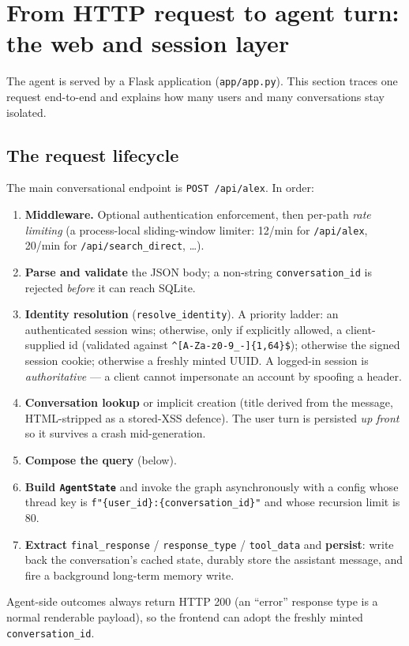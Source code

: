 \documentclass[11pt,a4paper]{article}
\newcommand{\code}[1]{\texttt{\small #1}}
\begin{document}
\section{From HTTP request to agent turn: the web and session layer}
\label{sec:web}

The agent is served by a Flask application (\code{app/app.py}). This section traces
one request end-to-end and explains how many users and many conversations stay
isolated.

\subsection{The request lifecycle}
The main conversational endpoint is \code{POST /api/alex}. In order:
\begin{enumerate}[leftmargin=1.6em,itemsep=2pt]
  \item \textbf{Middleware.} Optional authentication enforcement, then per-path
        \emph{rate limiting} (a process-local sliding-window limiter: 12/min for
        \code{/api/alex}, 20/min for \code{/api/search\_direct}, \dots).
  \item \textbf{Parse and validate} the JSON body; a non-string
        \code{conversation\_id} is rejected \emph{before} it can reach SQLite.
  \item \textbf{Identity resolution} (\code{resolve\_identity}). A priority ladder:
        an authenticated session wins; otherwise, only if explicitly allowed, a
        client-supplied id (validated against \code{\^{}[A-Za-z0-9\_-]\{1,64\}\$});
        otherwise the signed session cookie; otherwise a freshly minted UUID. A
        logged-in session is \emph{authoritative} --- a client cannot impersonate an
        account by spoofing a header.
  \item \textbf{Conversation lookup} or implicit creation (title derived from the
        message, HTML-stripped as a stored-XSS defence). The user turn is persisted
        \emph{up front} so it survives a crash mid-generation.
  \item \textbf{Compose the query} (below).
  \item \textbf{Build \code{AgentState}} and invoke the graph asynchronously with a
        config whose thread key is \code{f"\{user\_id\}:\{conversation\_id\}"} and whose
        recursion limit is $80$.
  \item \textbf{Extract} \code{final\_response} / \code{response\_type} /
        \code{tool\_data} and \textbf{persist}: write back the conversation's cached
        state, durably store the assistant message, and fire a background long-term
        memory write.
\end{enumerate}
Agent-side outcomes always return HTTP 200 (an ``error'' response type is a normal
renderable payload), so the frontend can adopt the freshly minted
\code{conversation\_id}.
\end{document}

